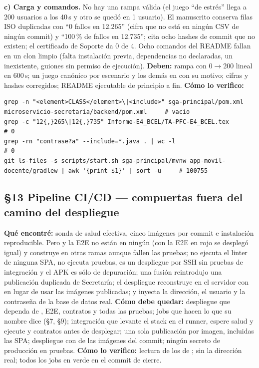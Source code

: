 \textbf{c) Carga y comandos.} No hay una rampa v\'alida (el juego ``de estr\'es'' llega a 200 usuarios a los 40\,s y otro se qued\'o en 1 usuario). El manuscrito conserva filas ISO duplicadas con ``0 fallos en 12.265'' (cifra que no est\'a en ning\'un CSV de ning\'un commit) y ``100\,\% de fallos en 12.735''; cita ocho hashes de commit que no existen; el certificado de Soporte da 0 de 4. Ocho comandos del README fallan en un clon limpio (falta instalaci\'on previa, dependencias no declaradas, un  inexistente, guiones sin permiso de ejecuci\'on). \textbf{Deben:} rampa con  0$\rightarrow$200 lineal en 600\,s; un juego can\'onico por escenario y los dem\'as en  con su motivo; cifras y hashes corregidos; README ejecutable de principio a fin. \textbf{C\'omo lo verifico:}\begin{verbatim}
grep -n "<element>CLASS</element>\|<include>" sga-principal/pom.xml microservicio-secretaria/backend/pom.xml     # vacio
grep -c "12{,}265\|12{,}735" Informe-E4_BCEL/TA-PFC-E4_BCEL.tex                                                # 0
grep -rn "contrase?a" --include=*.java . | wc -l                                                               # 0
git ls-files -s scripts/start.sh sga-principal/mvnw app-movil-docente/gradlew | awk '{print $1}' | sort -u     # 100755
\end{verbatim}

\subsection*{\S13 Pipeline CI/CD --- compuertas fuera del camino del despliegue}
\textbf{Qu\'e encontr\'e:} sonda de salud efectiva, cinco im\'agenes por commit e instalaci\'on reproducible. Pero  y la E2E no est\'an en ning\'un  (con la E2E en rojo se despleg\'o igual) y  construye en otras ramas aunque fallen las pruebas;  no ejecuta el linter de ninguna SPA,  no ejecuta pruebas,  es un despliegue por SSH sin pruebas de integraci\'on y el APK es s\'olo de depuraci\'on; una fusi\'on reintrodujo una publicaci\'on duplicada de Secretar\'ia; el despliegue reconstruye en el servidor con  en lugar de usar las im\'agenes publicadas; y  inyecta la direcci\'on, el usuario  y la contrase\~na de la base de datos real. \textbf{C\'omo debe quedar:} despliegue que dependa de , E2E, contratos y todas las pruebas; jobs que hacen lo que su nombre dice (\S7, \S9); integraci\'on que levante el stack en el runner, espere salud y ejecute  y contratos antes de desplegar; una sola publicaci\'on por imagen, incluidas las SPA; despliegue con  de las im\'agenes del commit; ning\'un secreto de producci\'on en pruebas. \textbf{C\'omo lo verifico:} lectura de los  de ;  sin la direcci\'on real; todos los jobs en verde en el commit de cierre.

